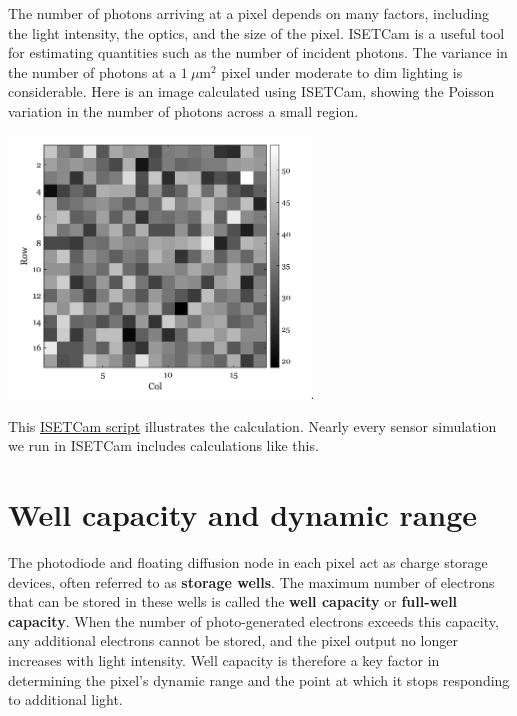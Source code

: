 \documentclass[
  letterpaper,
]{book}
\begin{document}
\begin{tcolorbox}[enhanced jigsaw, colframe=quarto-callout-note-color-frame, titlerule=0mm, rightrule=.15mm, opacitybacktitle=0.6, colback=white, leftrule=.75mm, coltitle=black, title=\textcolor{quarto-callout-note-color}{\faInfo}\hspace{0.5em}{Photons per pixel}, bottomrule=.15mm, colbacktitle=quarto-callout-note-color!10!white, breakable, left=2mm, bottomtitle=1mm, toptitle=1mm, opacityback=0, arc=.35mm, toprule=.15mm]

The number of photons arriving at a pixel depends on many factors,
including the light intensity, the optics, and the size of the pixel.
ISETCam is a useful tool for estimating quantities such as the number of
incident photons. The variance in the number of photons at a
\(1~\mu\text{m}^2\) pixel under moderate to dim lighting is
considerable. Here is an image calculated using ISETCam, showing the
Poisson variation in the number of photons across a small region.

\includegraphics[width=0.6\textwidth,height=\textheight]{chapters/images/sensors/15-parameters/03-photonimage.png}.

This \href{../code/fise_opticsCountingPhotons.html}{ISETCam script}
illustrates the calculation. Nearly every sensor simulation we run in
ISETCam includes calculations like this.

\end{tcolorbox}

\section{Well capacity and dynamic
range}\label{sec-wellcapacity-dynamicrange}

The photodiode and floating diffusion node in each pixel act as charge
storage devices, often referred to as \textbf{storage wells}. The
maximum number of electrons that can be stored in these wells is called
the \textbf{well capacity} or \textbf{full-well capacity}. When the
number of photo-generated electrons exceeds this capacity, any
additional electrons cannot be stored, and the pixel output no longer
increases with light intensity. Well capacity is therefore a key factor
in determining the pixel's dynamic range and the point at which it stops
responding to additional light.
\end{document}
